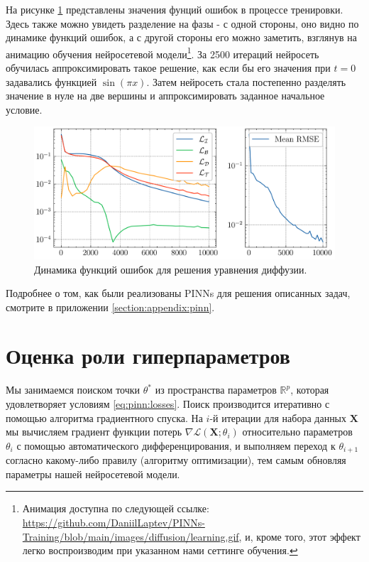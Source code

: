 \documentclass[a4paper, 12pt]{article}
\begin{document}
На рисунке \ref{fig:diffusion:losses} представлены значения фунций ошибок в процессе тренировки. Здесь также можно увидеть разделение на фазы - с одной стороны, оно видно по динамике функций ошибок, а с другой стороны его можно заметить, взглянув на анимацию обучения нейросетевой модели\footnote{Анимация доступна по следующей ссылке: \url{https://github.com/DaniilLaptev/PINNs-Training/blob/main/images/diffusion/learning.gif}, и, кроме того, этот эффект легко воспроизводим при указанном нами сеттинге обучения.}. За 2500 итераций нейросеть обучилась аппроксимировать такое решение, как если бы его значения при $t=0$ задавались функцией $\sin(\pi x)$. Затем нейросеть стала постепенно разделять значение в нуле на две вершины и аппроксимировать заданное начальное условие.

\begin{figure}
    \centering
    \includegraphics{../images/diffusion/Loss report.png}
    \caption{Динамика функций ошибок для решения уравнения диффузии.}
    \label{fig:diffusion:losses}
\end{figure}

Подробнее о том, как были реализованы PINNs для решения описанных задач, смотрите в приложении \ref{section:appendix:pinn}.

\section{Оценка роли гиперпараметров} \label{section:hyperparameters}

Мы занимаемся поиском точки $\theta^*$ из пространства параметров $\mathbb{R}^p$, которая удовлетворяет условиям \ref{eq:pinn:losses}. Поиск производится итеративно с помощью алгоритма градиентного спуска. На $i$-й итерации для набора данных $\mathbf{X}$ мы вычисляем градиент функции потерь $\nabla \mathcal{L}(\mathbf{X}; \theta_i)$ относительно параметров $\theta_i$ с помощью автоматического дифференцирования, и выполняем переход к $\theta_{i+1}$ согласно какому-либо правилу (алгоритму оптимизации), тем самым обновляя параметры нашей нейросетевой модели.
\end{document}
